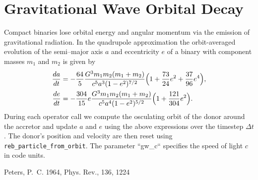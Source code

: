 \section{Gravitational Wave Orbital Decay}
\label{sec:gw_decay}

Compact binaries lose orbital energy and angular momentum via the emission of gravitational radiation.  In the quadrupole approximation the orbit-averaged evolution of the semi--major axis $a$ and eccentricity $e$ of a binary with component masses $m_1$ and $m_2$ is given by \citet{Peters1964}
\begin{align}
  \frac{da}{dt} &= -\frac{64}{5}\frac{G^3 m_1 m_2 (m_1+m_2)}{c^5 a^3 (1-e^2)^{7/2}}\Bigl(1+\frac{73}{24}e^2+\frac{37}{96}e^4\Bigr),\\
  \frac{de}{dt} &= -\frac{304}{15}e\frac{G^3 m_1 m_2 (m_1+m_2)}{c^5 a^4 (1-e^2)^{5/2}}\Bigl(1+\frac{121}{304}e^2\Bigr).
\end{align}
During each operator call we compute the osculating orbit of the donor around the accretor and update $a$ and $e$ using the above expressions over the timestep $\Delta t$.  The donor's position and velocity are then reset using \texttt{reb\_particle\_from\_orbit}.  The parameter ``gw\_c`` specifies the speed of light $c$ in code units.


\begin{thebibliography}{99}
 Peters, P.~C. 1964, Phys. Rev., 136, 1224
\end{thebibliography}
